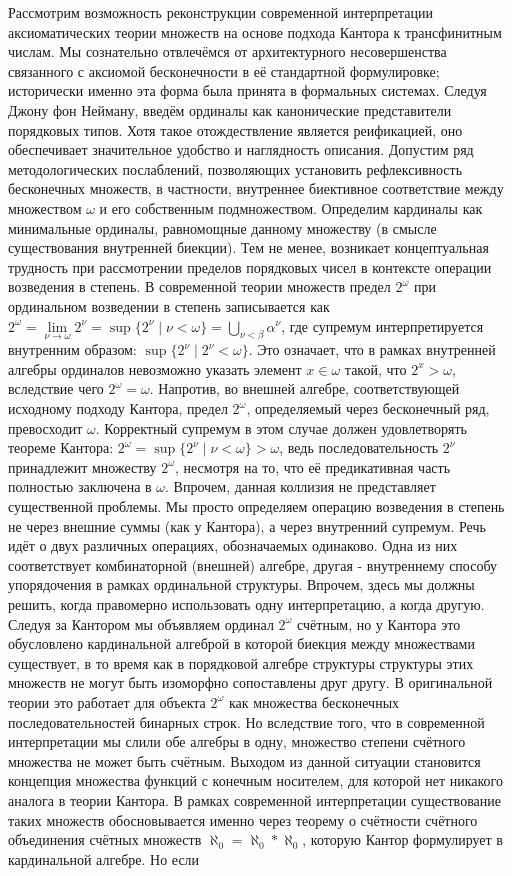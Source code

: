 \documentclass[12pt]{article}
\begin{document}
Рассмотрим возможность реконструкции современной интерпретации аксиоматических теории множеств на основе подхода Кантора к трансфинитным числам. Мы сознательно отвлечёмся от архитектурного несовершенства связанного с аксиомой бесконечности в её стандартной формулировке; исторически именно эта форма была принята в формальных системах. Следуя Джону фон Нейману, введём ординалы как канонические представители порядковых типов. Хотя такое отождествление является реификацией, оно обеспечивает значительное удобство и наглядность описания. Допустим ряд методологических послаблений, позволяющих установить рефлексивность бесконечных множеств, в частности, внутреннее биективное соответствие между множеством $\omega$ и его собственным подмножеством. Определим кардиналы как минимальные ординалы, равномощные данному множеству (в смысле существования внутренней биекции). Тем не менее, возникает концептуальная трудность при рассмотрении пределов порядковых чисел в контексте операции возведения в степень. В современной теории множеств предел $2^{\omega}$ при ординальном возведении в степень записывается как $2^{\omega} = \lim\limits_{\nu \to \omega} 2^{\nu} = \sup \{ 2^{\nu} \mid \nu < \omega \} = \bigcup\limits_{\nu < \beta} \alpha^{\nu}$, где супремум интерпретируется внутренним образом: $\sup \{ 2^{\nu} \mid 2^{\nu} < \omega \}$. Это означает, что в рамках внутренней алгебры ординалов невозможно указать элемент $x \in \omega$ такой, что $2^{x} > \omega$, вследствие чего $2^{\omega} = \omega$. Напротив, во внешней алгебре, соответствующей исходному подходу Кантора, предел $2^\omega$, определяемый через бесконечный ряд, превосходит $\omega$. Корректный супремум в этом случае должен удовлетворять теореме Кантора: $2^{\omega} = \sup \{ 2^{\nu} \mid \nu < \omega \} > \omega$, ведь последовательность $2^{\nu}$ принадлежит множеству $2^{\omega}$, несмотря на то, что её предикативная часть полностью заключена в $\omega$. Впрочем, данная коллизия не представляет существенной проблемы. Мы просто определяем операцию возведения в степень не через внешние суммы (как у Кантора), а через внутренний супремум. Речь идёт о двух различных операциях, обозначаемых одинаково. Одна из них соответствует комбинаторной (внешней) алгебре, другая - внутреннему способу упорядочения в рамках ординальной структуры. Впрочем, здесь мы должны решить, когда правомерно использовать одну интерпретацию, а когда другую. Следуя за Кантором мы объявляем ординал $2^{\omega}$ счётным, но у Кантора это обусловлено кардинальной алгеброй в которой биекция между множествами существует, в то время как в порядковой алгебре структуры структуры этих множеств не могут быть изоморфно сопоставлены друг другу. В оригинальной теории это работает для объекта $2^{\omega}$ как множества бесконечных последовательностей бинарных строк. Но вследствие того, что в современной интерпретации мы слили обе алгебры в одну, множество степени счётного множества не может быть счётным. Выходом из данной ситуации становится концепция множества функций с конечным носителем, для которой нет никакого аналога в теории Кантора. В рамках современной интерпретации существование таких множеств обосновывается именно через теорему о счётности счётного объединения счётных множеств $\aleph_0 = \aleph_0*\aleph_0$, которую Кантор формулирует в кардинальной алгебре. Но если 
\end{document}
